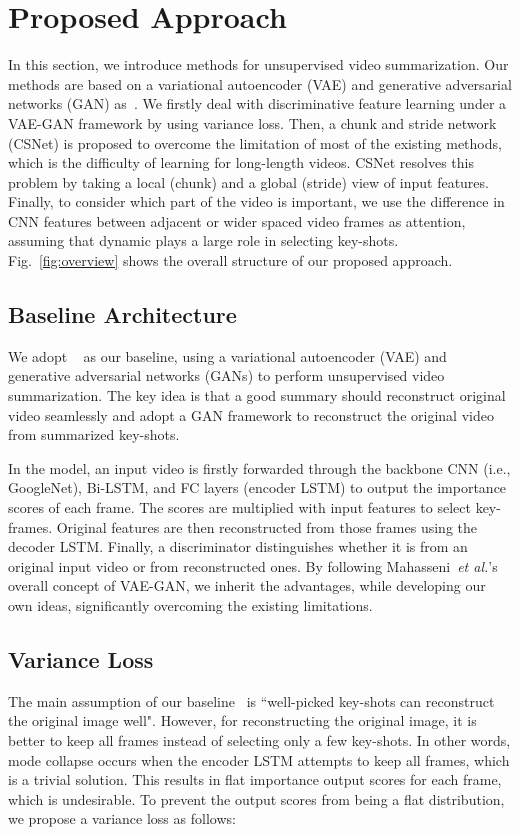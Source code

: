 \documentclass[letterpaper]{article} \usepackage{aaai19}  \usepackage{times}  \usepackage{helvet}  \usepackage{courier}  \usepackage{url}  \usepackage{graphicx}  \frenchspacing  \setlength{\pdfpagewidth}{8.5in}  \setlength{\pdfpageheight}{11in}
\newcommand{\figref}[1]{Fig.~\ref{#1}}
\newcommand{\etal}{\textit{et al.}}
\begin{document}
\section{Proposed Approach}
In this section, we introduce methods for unsupervised video summarization. Our methods are based on a variational autoencoder (VAE) and generative adversarial networks (GAN) as~\cite{Mahasseni2017VAEGAN}. We firstly deal with discriminative feature learning under a VAE-GAN framework by using variance loss. Then, a chunk and stride network (CSNet) is proposed to overcome the limitation of most of the existing methods, which is the difficulty of learning for long-length videos. CSNet resolves this problem by taking a local (chunk) and a global (stride) view of input features. Finally, to consider which part of the video is important, we use the difference in CNN features between adjacent or wider spaced video frames as attention, assuming that dynamic plays a large role in selecting key-shots. \figref{fig:overview} shows the overall structure of our proposed approach.



\subsection{Baseline Architecture}
We adopt ~\cite{Mahasseni2017VAEGAN} as our baseline, using a variational autoencoder (VAE) and generative adversarial networks (GANs) to perform unsupervised video summarization. The key idea is that a good summary should reconstruct original video seamlessly and adopt a GAN framework to reconstruct the original video from summarized key-shots.

In the model, an input video is firstly forwarded through the backbone CNN (i.e., GoogleNet), Bi-LSTM, and FC layers (encoder LSTM) to output the importance scores of each frame. The scores are multiplied with input features to select key-frames. Original features are then reconstructed from those frames using the decoder LSTM. Finally, a discriminator distinguishes whether it is from an original input video or from reconstructed ones. By following Mahasseni~\etal{}'s overall concept of VAE-GAN, we inherit the advantages, while developing our own ideas, significantly overcoming the existing limitations.



\subsection{Variance Loss}
The main assumption of our baseline~\cite{Mahasseni2017VAEGAN} is ``well-picked key-shots can reconstruct the original image well". However, for reconstructing the original image, it is better to keep all frames instead of selecting only a few key-shots. In other words, mode collapse occurs when the encoder LSTM attempts to keep all frames, which is a trivial solution. This results in flat importance output scores for each frame, which is undesirable. To prevent the output scores from being a flat distribution, we propose a variance loss as follows:
\end{document}

